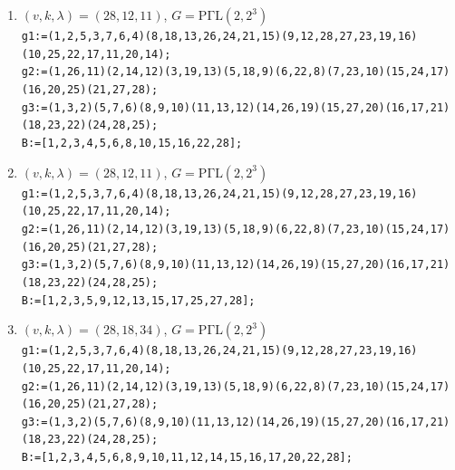 \documentclass[a4paper,twopage,reqno,12pt]{amsart}
\theoremstyle{definition}
\numberwithin{equation}{section}
\newcommand{\PGaL}{\mathrm{P\Gamma L}}
\newcommand{\Aut}{\mathrm{Aut}}
\begin{document}
\begin{enumerate}
    \item\label{281211_1} $(v,k,\lambda)=(28,12,11)$, $G=\PGaL(2,2^3)$\\
    {\scriptsize \texttt{g1:=(1,2,5,3,7,6,4)(8,18,13,26,24,21,15)(9,12,28,27,23,19,16)(10,25,22,17,11,20,14);}\\
    \texttt{g2:=(1,26,11)(2,14,12)(3,19,13)(5,18,9)(6,22,8)(7,23,10)(15,24,17)(16,20,25)(21,27,28);}\\
    \texttt{g3:=(1,3,2)(5,7,6)(8,9,10)(11,13,12)(14,26,19)(15,27,20)(16,17,21)(18,23,22)(24,28,25);}\\}
    \texttt{B:=[1,2,3,4,5,6,8,10,15,16,22,28];}
    
    
    \item\label{281211_2} $(v,k,\lambda)=(28,12,11)$, $G=\PGaL(2,2^3)$\\
    {\scriptsize \texttt{g1:=(1,2,5,3,7,6,4)(8,18,13,26,24,21,15)(9,12,28,27,23,19,16)(10,25,22,17,11,20,14);}\\
    \texttt{g2:=(1,26,11)(2,14,12)(3,19,13)(5,18,9)(6,22,8)(7,23,10)(15,24,17)(16,20,25)(21,27,28);}\\
    \texttt{g3:=(1,3,2)(5,7,6)(8,9,10)(11,13,12)(14,26,19)(15,27,20)(16,17,21)(18,23,22)(24,28,25);}}\\
    \texttt{B:=[1,2,3,5,9,12,13,15,17,25,27,28];}\\

    \item\label{281834} $(v,k,\lambda)=(28,18,34)$, $G=\PGaL(2,2^3)$\\
    {\scriptsize \texttt{g1:=(1,2,5,3,7,6,4)(8,18,13,26,24,21,15)(9,12,28,27,23,19,16)(10,25,22,17,11,20,14);}\\
    \texttt{g2:=(1,26,11)(2,14,12)(3,19,13)(5,18,9)(6,22,8)(7,23,10)(15,24,17)(16,20,25)(21,27,28);}\\
    \texttt{g3:=(1,3,2)(5,7,6)(8,9,10)(11,13,12)(14,26,19)(15,27,20)(16,17,21)(18,23,22)(24,28,25);}}\\
    \texttt{B:=[1,2,3,4,5,6,8,9,10,11,12,14,15,16,17,20,22,28];}\\


\end{enumerate}
\end{document}
